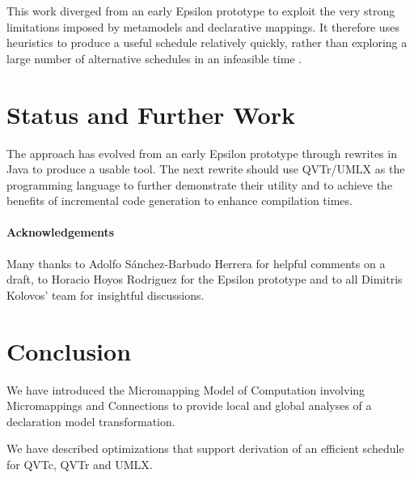 \documentclass{llncs}
\begin{document}
This work diverged from an early Epsilon prototype to exploit the very strong limitations imposed by metamodels and declarative mappings. It therefore uses heuristics to produce a useful schedule relatively quickly, rather than exploring a large number of alternative schedules in an infeasible time \cite{Horacio-planning}.

\section{Status and Further Work}\label{Status}

The approach has evolved from an early Epsilon prototype through rewrites in Java to produce a usable tool. The next rewrite should use QVTr/UMLX as the programming language to further demonstrate their utility and to achieve the benefits of incremental code generation to enhance compilation times.

\paragraph{Acknowledgements}

Many thanks to Adolfo S\'anchez-Barbudo Herrera for helpful comments on a draft, to Horacio Hoyos Rodriguez for the Epsilon prototype and to all Dimitris Kolovos' team for insightful discussions.

\section{Conclusion}\label{Conclusion}

We have introduced the Micromapping Model of Computation involving Micromappings and Connections to provide local and global analyses of a declaration model transformation. 

We have described optimizations that support derivation of an efficient schedule for  QVTc, QVTr and UMLX.
\end{document}
